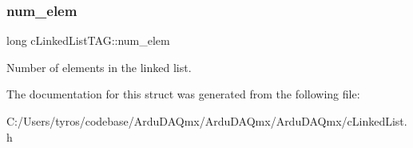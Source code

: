 \subsubsection{\texorpdfstring{num\+\_\+elem}{num\_elem}}
{\footnotesize\ttfamily long c\+Linked\+List\+T\+A\+G\+::num\+\_\+elem}

Number of elements in the linked list. 

The documentation for this struct was generated from the following file\+:\begin{DoxyCompactItemize}
\item 
C\+:/\+Users/tyros/codebase/\+Ardu\+D\+A\+Qmx/\+Ardu\+D\+A\+Qmx/\+Ardu\+D\+A\+Qmx/c\+Linked\+List.\+h\end{DoxyCompactItemize}
